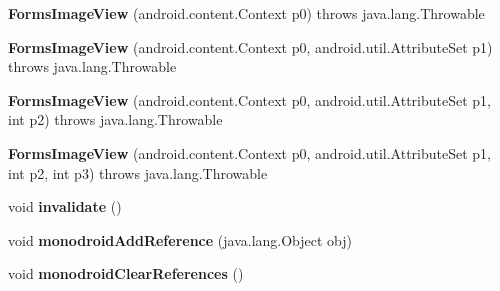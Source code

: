 \begin{DoxyCompactItemize}
\item 
\mbox{\label{classmd5b60ffeb829f638581ab2bb9b1a7f4f3f_1_1_forms_image_view_aee489db3f6d7a8dfa9800139a04eaeda}} 
{\bfseries Forms\+Image\+View} (android.\+content.\+Context p0)  throws java.\+lang.\+Throwable 	
\item 
\mbox{\label{classmd5b60ffeb829f638581ab2bb9b1a7f4f3f_1_1_forms_image_view_a8ba0beff3d66206db1bb62532722d902}} 
{\bfseries Forms\+Image\+View} (android.\+content.\+Context p0, android.\+util.\+Attribute\+Set p1)  throws java.\+lang.\+Throwable 	
\item 
\mbox{\label{classmd5b60ffeb829f638581ab2bb9b1a7f4f3f_1_1_forms_image_view_a65c516e6939a16b2841dc673bd36a971}} 
{\bfseries Forms\+Image\+View} (android.\+content.\+Context p0, android.\+util.\+Attribute\+Set p1, int p2)  throws java.\+lang.\+Throwable 	
\item 
\mbox{\label{classmd5b60ffeb829f638581ab2bb9b1a7f4f3f_1_1_forms_image_view_ac4e4d979e4813af986f532bf966d2c41}} 
{\bfseries Forms\+Image\+View} (android.\+content.\+Context p0, android.\+util.\+Attribute\+Set p1, int p2, int p3)  throws java.\+lang.\+Throwable 	
\item 
\mbox{\label{classmd5b60ffeb829f638581ab2bb9b1a7f4f3f_1_1_forms_image_view_ae6e31fe48b36ca1c798beed0dae7f507}} 
void {\bfseries invalidate} ()
\item 
\mbox{\label{classmd5b60ffeb829f638581ab2bb9b1a7f4f3f_1_1_forms_image_view_a80b45cf11c7131a04bd92ebaebbc6a12}} 
void {\bfseries monodroid\+Add\+Reference} (java.\+lang.\+Object obj)
\item 
\mbox{\label{classmd5b60ffeb829f638581ab2bb9b1a7f4f3f_1_1_forms_image_view_a2801900ce9e0aca76fb2360c2830ecba}} 
void {\bfseries monodroid\+Clear\+References} ()
\end{DoxyCompactItemize}
